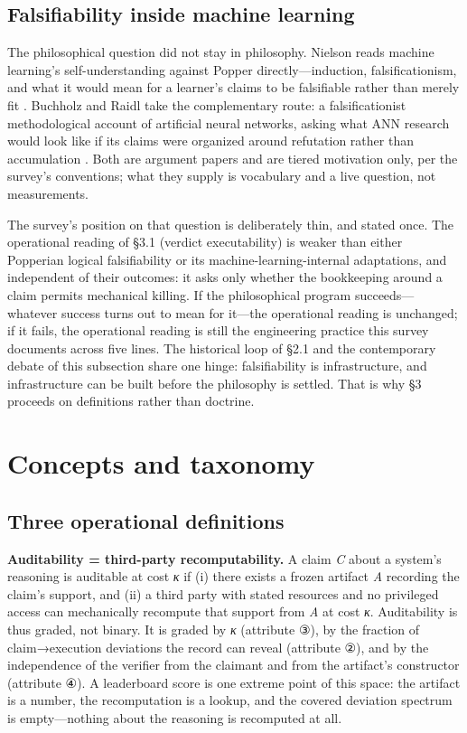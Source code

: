 \documentclass[11pt,a4paper]{article}
\begin{document}
\subsection{Falsifiability inside machine learning}

The philosophical question did not stay in philosophy. Nielson reads machine learning's self-understanding against Popper directly—induction, falsificationism, and what it would mean for a learner's claims to be falsifiable rather than merely fit \cite{key27}. Buchholz and Raidl take the complementary route: a falsificationist methodological account of artificial neural networks, asking what ANN research would look like if its claims were organized around refutation rather than accumulation \cite{key28}. Both are argument papers and are tiered motivation only, per the survey's conventions; what they supply is vocabulary and a live question, not measurements.

The survey's position on that question is deliberately thin, and stated once. The operational reading of §3.1 (verdict executability) is weaker than either Popperian logical falsifiability or its machine-learning-internal adaptations, and independent of their outcomes: it asks only whether the bookkeeping around a claim permits mechanical killing. If the philosophical program succeeds—whatever success turns out to mean for it—the operational reading is unchanged; if it fails, the operational reading is still the engineering practice this survey documents across five lines. The historical loop of §2.1 and the contemporary debate of this subsection share one hinge: falsifiability is infrastructure, and infrastructure can be built before the philosophy is settled. That is why §3 proceeds on definitions rather than doctrine.

\section{Concepts and taxonomy}

\subsection{Three operational definitions}

\textbf{Auditability = third-party recomputability.} A claim \textit{C} about a system's reasoning is auditable at cost \textit{κ} if (i) there exists a frozen artifact \textit{A} recording the claim's support, and (ii) a third party with stated resources and no privileged access can mechanically recompute that support from \textit{A} at cost \textit{κ}. Auditability is thus graded, not binary. It is graded by \textit{κ} (attribute ③), by the fraction of claim→execution deviations the record can reveal (attribute ②), and by the independence of the verifier from the claimant and from the artifact's constructor (attribute ④). A leaderboard score is one extreme point of this space: the artifact is a number, the recomputation is a lookup, and the covered deviation spectrum is empty—nothing about the reasoning is recomputed at all.
\end{document}
